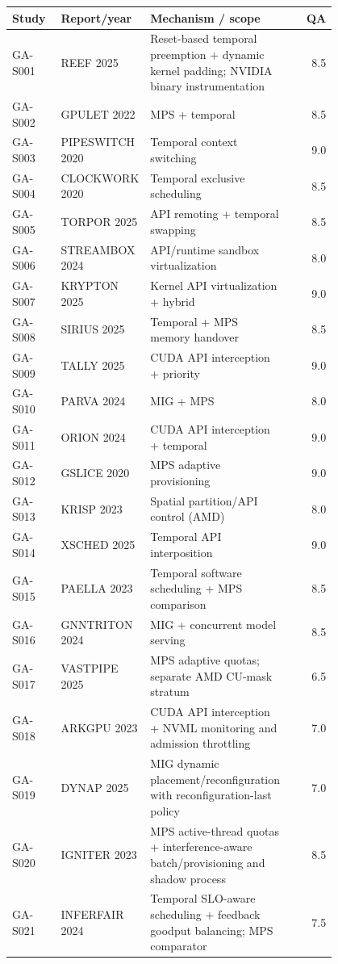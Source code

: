 \documentclass[12pt,a 4paper]{article}
\begin{document}
\begin{longtable}{P{0.15\linewidth}P{0.25\linewidth}P{0.4\linewidth}r}
\toprule Study & Report/year & Mechanism / scope & QA\\\midrule\endhead
GA-S001 & REEF 2025 \cite{reef} & Reset-based temporal preemption + dynamic kernel padding; NVIDIA binary instrumentation & 8.5\\
GA-S002 & GPULET 2022 \cite{gpulet} & MPS + temporal & 8.5\\
GA-S003 & PIPESWITCH 2020 \cite{pipeswitch} & Temporal context switching & 9.0\\
GA-S004 & CLOCKWORK 2020 \cite{clockwork} & Temporal exclusive scheduling & 8.5\\
GA-S005 & TORPOR 2025 \cite{torpor} & API remoting + temporal swapping & 8.5\\
GA-S006 & STREAMBOX 2024 \cite{streambox} & API/runtime sandbox virtualization & 8.0\\
GA-S007 & KRYPTON 2025 \cite{krypton} & Kernel API virtualization + hybrid & 9.0\\
GA-S008 & SIRIUS 2025 \cite{sirius} & Temporal + MPS memory handover & 8.5\\
GA-S009 & TALLY 2025 \cite{tally} & CUDA API interception + priority & 9.0\\
GA-S010 & PARVA 2024 \cite{parva} & MIG + MPS & 8.0\\
GA-S011 & ORION 2024 \cite{orion} & CUDA API interception + temporal & 9.0\\
GA-S012 & GSLICE 2020 \cite{gslice} & MPS adaptive provisioning & 9.0\\
GA-S013 & KRISP 2023 \cite{krisp} & Spatial partition/API control (AMD) & 8.0\\
GA-S014 & XSCHED 2025 \cite{xsched} & Temporal API interposition & 9.0\\
GA-S015 & PAELLA 2023 \cite{paella} & Temporal software scheduling + MPS comparison & 8.5\\
GA-S016 & GNNTRITON 2024 \cite{gnntriton} & MIG + concurrent model serving & 8.5\\
GA-S017 & VASTPIPE 2025 \cite{vastpipe} & MPS adaptive quotas; separate AMD CU-mask stratum & 6.5\\
GA-S018 & ARKGPU 2023 \cite{arkgpu} & CUDA API interception + NVML monitoring and admission throttling & 7.0\\
GA-S019 & DYNAP 2025 \cite{dynap} & MIG dynamic placement/reconfiguration with reconfiguration-last policy & 7.0\\
GA-S020 & IGNITER 2023 \cite{igniter} & MPS active-thread quotas + interference-aware batch/provisioning and shadow process & 8.5\\
GA-S021 & INFERFAIR 2024 \cite{inferfair} & Temporal SLO-aware scheduling + feedback goodput balancing; MPS comparator & 7.5\\
\bottomrule\end{longtable}
\end{document}
